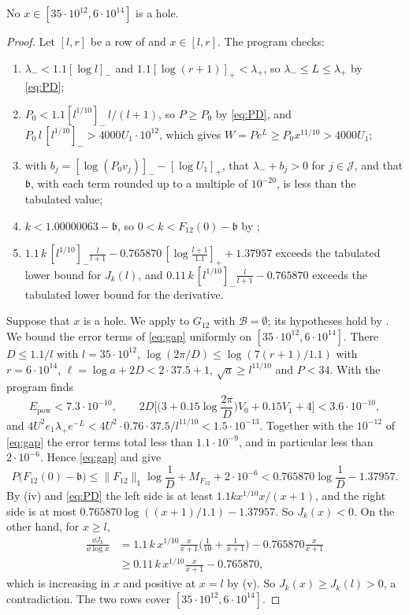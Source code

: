 \documentclass[11pt,colorlinks]{charlie}
\newcommand{\cB}{\mathcal B}
\newcommand{\cJ}{\mathcal J}
\begin{document}
\begin{proposition}\label{prop:twelve}
No $x\in[35\cdot10^{12},6\cdot10^{14}]$ is a hole.
\end{proposition}
\begin{proof}
Let $[l,r]$ be a row of  and $x\in[l,r]$. The program checks:
\begin{enumerate}[label=(\roman*)]
\item $\lambda_-<1.1[\log l]_-$ and $1.1[\log(r+1)]_+<\lambda_+$, so $\lambda_-\le L\le\lambda_+$ by \eqref{eq:PD};
\item $P_0<1.1[l^{1/10}]_-\,l/(l+1)$, so $P\ge P_0$ by \eqref{eq:PD}, and $P_0\,l\,[l^{1/10}]_->4000U_1\cdot10^{12}$, which gives $W=Pe^L\ge P_0x^{11/10}>4000U_1$;
\item with $b_j=[\log(P_0v_j)]_--[\log U_1]_+$, that $\lambda_-+b_j>0$ for $j\in\cJ$, and that $\mathfrak b$, with each term rounded up to a multiple of $10^{-20}$, is less than the tabulated value;
\item $k<1.00000063-\mathfrak b$, so $0<k<F_{12}(0)-\mathfrak b$ by ;
\item $1.1\,k\,[l^{1/10}]_-\frac l{l+1}-0.765870\,[\log\frac{l+1}{1.1}]_++1.37957$ exceeds the tabulated lower bound for $J_k(l)$, and $0.11\,k\,[l^{1/10}]_-\frac l{l+1}-0.765870$ exceeds the tabulated lower bound for the derivative.
\end{enumerate}
Suppose that $x$ is a hole. We apply  to $G_{12}$ with $\cB=\emptyset$; its hypotheses hold by . We bound the error terms of \eqref{eq:gap} uniformly on $[35\cdot10^{12},6\cdot10^{14}]$. There $D\le1.1/l$ with $l=35\cdot10^{12}$, $\log(2\pi/D)\le\log(7(r+1)/1.1)$ with $r=6\cdot10^{14}$, $\ell=\log a+2D<2\cdot37.5+1$, $\sqrt a\ge l^{11/10}$ and $P<34$. With  the program finds
\[
 E_{\mathrm{pow}}<7.3\cdot10^{-10},\qquad2D\Big[\Big(3+0.15\log\frac{2\pi}D\Big)V_0+0.15V_1+4\Big]<3.6\cdot10^{-10},
\]
and $4U^2e_1\lambda_+e^{-L}<4U^2\cdot0.76\cdot37.5/l^{11/10}<1.5\cdot10^{-13}$. Together with the $10^{-12}$ of \eqref{eq:gap} the error terms total less than $1.1\cdot10^{-9}$, and in particular less than $2\cdot10^{-6}$. Hence \eqref{eq:gap} and  give
\[
 P\big(F_{12}(0)-\mathfrak b\big)\le\|F_{12}\|_1\log\frac1D+M_{F_{12}}+2\cdot10^{-6}<0.765870\log\frac1D-1.37957 .
\]
By (iv) and \eqref{eq:PD} the left side is at least $1.1kx^{1/10}x/(x+1)$, and the right side is at most $0.765870\log((x+1)/1.1)-1.37957$. So $J_k(x)<0$. On the other hand, for $x\ge l$,
\begin{align*}
 \frac{\dd J_k}{\dd\log x}&=1.1\,k\,x^{1/10}\frac x{x+1}\Big(\frac1{10}+\frac1{x+1}\Big)-0.765870\frac x{x+1}\\
 &\ge0.11\,k\,x^{1/10}\frac x{x+1}-0.765870,
\end{align*}
which is increasing in $x$ and positive at $x=l$ by (v). So $J_k(x)\ge J_k(l)>0$, a contradiction. The two rows cover $[35\cdot10^{12},6\cdot10^{14}]$.
\end{proof}
\end{document}
